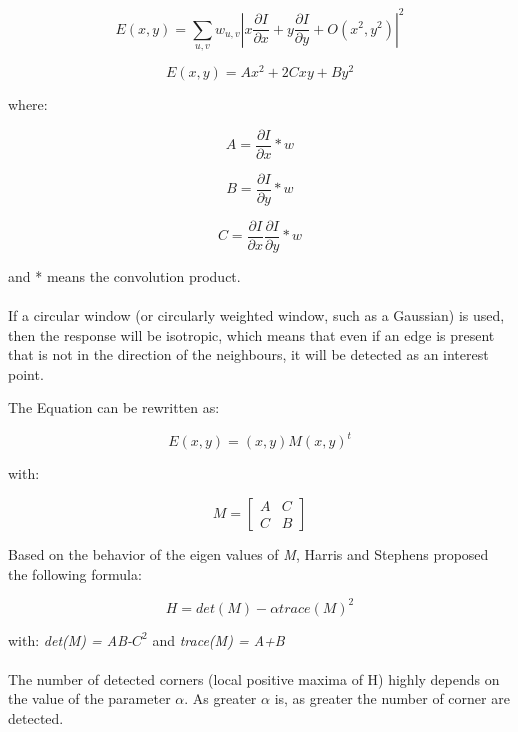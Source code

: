 \documentclass{article}
\begin{document}
	\begin{equation}
	E(x,y) = \sum_{u,v} w_{u,v}   |x \frac{\partial I}{\partial x} + y \frac{\partial I}{\partial y} + O(x^2,y^2)|^2
	\end{equation}

	\begin{equation}
	E(x,y) = Ax^2 + 2Cxy + By^2
	\end{equation}
	
	where:
	
	\begin{equation}
	A = \frac{\partial I}{\partial x} * w
	\end{equation}

	\begin{equation}
	B = \frac{\partial I}{\partial y} * w
	\end{equation}

	\begin{equation}
	C = \frac{\partial I}{\partial x} \frac{\partial I}{\partial y} * w
	\end{equation}

	and  * means the convolution product.
	\\\\
	If a circular window (or circularly weighted window, such as a Gaussian) is used, then the response will be isotropic, which means that even if an edge is present that is not in the direction of the neighbours, it will be detected as an interest point.

	The Equation can be rewritten as:

	\begin{equation}
	E(x,y) = (x,y)M(x,y)^t
	\end{equation}
	
	with:

	\begin{equation}
	M = 	\begin{bmatrix}
		A&C\\
		C&B
		\end{bmatrix}
	\end{equation}

	Based on the behavior of the eigen values of \textit{M}, Harris and Stephens proposed the following formula:

	\begin{equation}
	H = det(M) - \alpha trace(M)^2
	\end{equation}

	with: \textit{det(M) = AB-$C^2$} and \textit{trace(M) = A+B}
	\\\\
	The number of detected corners (local positive maxima of H) highly depends on the value of the parameter \textit{$\alpha$}. As greater \textit{$\alpha$} is, as greater the number of corner are detected.
	
\end{document}
